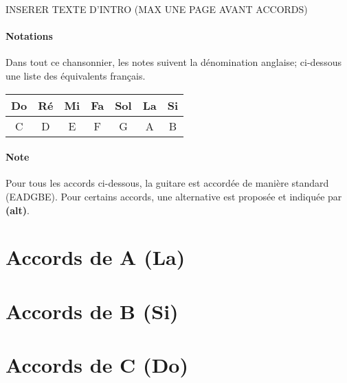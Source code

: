 
INSERER TEXTE D'INTRO (MAX UNE PAGE AVANT ACCORDS)
\paragraph{Notations} Dans tout ce chansonnier, les notes suivent la dénomination anglaise; ci-dessous une liste des équivalents français.
\newline\newline
\begin{tabular}{||c||c||c||c||c||c||c||}
    \hline
    Do & Ré & Mi & Fa & Sol & La & Si\\
    \hline
    C & D & E & F & G & A & B\\
    \hline
\end{tabular}
\vfill
\paragraph{Note} Pour tous les accords ci-dessous, la guitare est accordée de manière standard (EADGBE).\newline
Pour certains accords, une alternative est proposée et indiquée par \textbf{(alt)}.

\newpage
\section{Accords de A (La)}
\usebox{\A}
\usebox{\Aalt}
\usebox{\Am}
\usebox{\Amalt}
\usebox{\Afive}
\usebox{\Aseven}
\usebox{\Asevenalt}
\usebox{\Amajseven}
\usebox{\Amajsevenalt}
\usebox{\Amseven}
\usebox{\Amsevenalt}
\usebox{\Asusfour}
\usebox{\Asusfouralt}
\usebox{\Aaddnine}
\usebox{\Asustwo}
\usebox{\Asevensusfour}
\usebox{\Asevensusfouralt}
\usebox{\Asevensharpnine}
\usebox{\Anine}

\newpage
\section{Accords de B (Si)}
\usebox{\B}
\usebox{\Bm}
\usebox{\Bfive}
\usebox{\Bseven}
\usebox{\Bsevenalt}
\usebox{\Bmajseven}
\usebox{\Bmseven}
\usebox{\Bsusfour}
\usebox{\Baddnine}
\usebox{\Bsustwo}
\usebox{\Bsevensusfour}
\usebox{\Bsevensharpnine}
\usebox{\Bnine}

\newpage
\section{Accords de C (Do)}
\usebox{\C}
\usebox{\Calt}
\usebox{\Cm}
\usebox{\Cfive}
\usebox{\Cseven}
\usebox{\Csevenalt}
\usebox{\Cmajseven}
\usebox{\Cmajsevenalt}
\usebox{\Cmseven}
\usebox{\Csusfour}
\usebox{\Caddnine}
\usebox{\Caddninealt}
\usebox{\Csustwo}
\usebox{\Csevensusfour}
\usebox{\Csevensharpnine}
\usebox{\Cnine}

